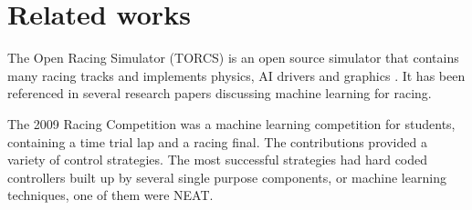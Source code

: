 




\section{Related works}

The Open Racing Simulator (TORCS) is an open source simulator that contains many racing tracks and implements physics, AI drivers and graphics \cite{torcs}. It has been referenced in several research papers discussing machine learning for racing.

The 2009 Racing Competition \cite{racingChamp2009} was a machine learning competition for students, containing a time trial lap and a racing final. The contributions provided a variety of control strategies. The most successful strategies had hard coded controllers built up by several single purpose components, or machine learning techniques, one of them were NEAT.

